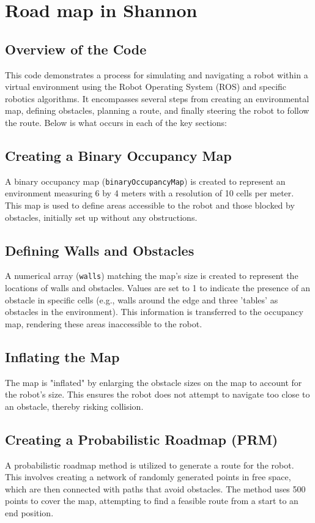 \documentclass[12pt,a4paper]{article}
\begin{document}
	\section{Road map in Shannon}
	\subsection{Overview of the Code}
	This code demonstrates a process for simulating and navigating a robot within a virtual environment using the Robot Operating System (ROS) and specific robotics algorithms. It encompasses several steps from creating an environmental map, defining obstacles, planning a route, and finally steering the robot to follow the route. Below is what occurs in each of the key sections:
	
	\subsection{Creating a Binary Occupancy Map}
	A binary occupancy map (\texttt{binaryOccupancyMap}) is created to represent an environment measuring 6 by 4 meters with a resolution of 10 cells per meter. This map is used to define areas accessible to the robot and those blocked by obstacles, initially set up without any obstructions.
	
	\subsection{Defining Walls and Obstacles}
	A numerical array (\texttt{walls}) matching the map's size is created to represent the locations of walls and obstacles. Values are set to 1 to indicate the presence of an obstacle in specific cells (e.g., walls around the edge and three 'tables' as obstacles in the environment). This information is transferred to the occupancy map, rendering these areas inaccessible to the robot.
	
	\subsection{Inflating the Map}
	The map is "inflated" by enlarging the obstacle sizes on the map to account for the robot's size. This ensures the robot does not attempt to navigate too close to an obstacle, thereby risking collision.
	
	\subsection{Creating a Probabilistic Roadmap (PRM)}
	A probabilistic roadmap method is utilized to generate a route for the robot. This involves creating a network of randomly generated points in free space, which are then connected with paths that avoid obstacles. The method uses 500 points to cover the map, attempting to find a feasible route from a start to an end position.
	
\end{document}
